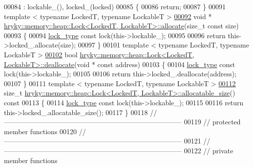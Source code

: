 \begin{DoxyCode}
00084     : lockable\_(), locked\_(locked)
00085 \{
00086     \textcolor{keywordflow}{return};
00087 \}
00091 \textcolor{keyword}{template} < \textcolor{keyword}{typename} LockedT, \textcolor{keyword}{typename} LockableT >
\hypertarget{memory__heap__lock_8h_source_l00092}{}\hyperlink{classhryky_1_1memory_1_1heap_1_1_lock_a5c1c6735480076daff287d98769b9735}{00092} \textcolor{keywordtype}{void} * \hyperlink{classhryky_1_1memory_1_1heap_1_1_lock}{hryky::memory::heap::Lock<LockedT, LockableT>::allocate}(\textcolor{keywordtype}{size\_t} \textcolor{keyword}{const} 
      size)
00093 \{
00094     \hyperlink{classhryky_1_1exclusion_1_1_lock}{lock_type} \textcolor{keyword}{const} lock(this->lockable\_);
00095     
00096     \textcolor{keywordflow}{return} this->locked\_.allocate(size);
00097 \}
00101 \textcolor{keyword}{template} < \textcolor{keyword}{typename} LockedT, \textcolor{keyword}{typename} LockableT >
\hypertarget{memory__heap__lock_8h_source_l00102}{}\hyperlink{classhryky_1_1memory_1_1heap_1_1_lock_a221ea34d7afea6045f84df3b1fa77b24}{00102} \textcolor{keywordtype}{bool} \hyperlink{classhryky_1_1memory_1_1heap_1_1_lock}{hryky::memory::heap::Lock<LockedT, LockableT>::deallocate}(\textcolor{keywordtype}{void} * \textcolor{keyword}{const} 
      address)
00103 \{
00104     \hyperlink{classhryky_1_1exclusion_1_1_lock}{lock_type} \textcolor{keyword}{const} lock(this->lockable\_);
00105     
00106     \textcolor{keywordflow}{return} this->locked\_.deallocate(address);
00107 \}
00111 \textcolor{keyword}{template} < \textcolor{keyword}{typename} LockedT, \textcolor{keyword}{typename} LockableT >
\hypertarget{memory__heap__lock_8h_source_l00112}{}\hyperlink{classhryky_1_1memory_1_1heap_1_1_lock_a469a43b261f5b0dc3ce2a78c7df31e2b}{00112} \textcolor{keywordtype}{size\_t} \hyperlink{classhryky_1_1memory_1_1heap_1_1_lock}{hryky::memory::heap::Lock<LockedT, LockableT>::allocatable_size}()\textcolor{keyword}{ const}
00113 \textcolor{keyword}{}\{
00114     \hyperlink{classhryky_1_1exclusion_1_1_lock}{lock_type} \textcolor{keyword}{const} lock(this->lockable\_);
00115     
00116     \textcolor{keywordflow}{return} this->locked\_.allocatable\_size();
00117 \}
00118 \textcolor{comment}{//
      ------------------------------------------------------------------------------}
00119 \textcolor{comment}{// protected member functions}
00120 \textcolor{comment}{//
      ------------------------------------------------------------------------------}
00121 \textcolor{comment}{//
      ------------------------------------------------------------------------------}
00122 \textcolor{comment}{// private member functions}

\end{DoxyCode}
